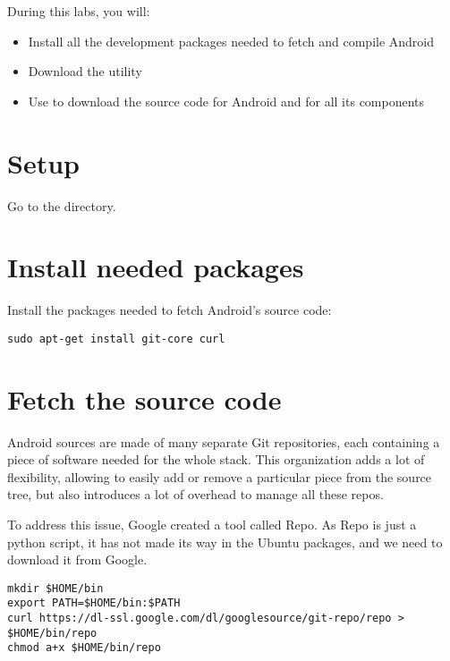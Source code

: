 
During this labs, you will:
\begin{itemize}
  \item Install all the development packages needed to fetch and compile Android
  \item Download the  utility
  \item Use  to download the source code for Android
        and for all its components 
\end{itemize}

\section{Setup}

Go to the  directory.

\section{Install needed packages}

Install the packages needed to fetch Android's source code:

\begin{verbatim}
sudo apt-get install git-core curl
\end{verbatim}

\section{Fetch the source code}

Android sources are made of many separate Git repositories, each containing a piece
of software needed for the whole stack. This organization adds a lot of
flexibility, allowing to easily add or remove a particular piece from the source
tree, but also introduces a lot of overhead to manage all these repos.

To address this issue, Google created a tool called Repo. As Repo is just a
python script, it has not made its way in the Ubuntu packages, and we need to
download it from Google.

\begin{verbatim}
mkdir $HOME/bin
export PATH=$HOME/bin:$PATH
curl https://dl-ssl.google.com/dl/googlesource/git-repo/repo > $HOME/bin/repo
chmod a+x $HOME/bin/repo
\end{verbatim}

